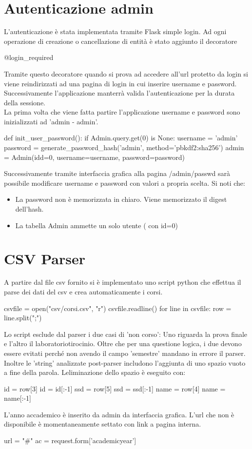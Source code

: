 \documentclass{article}
\begin{document}
\newpage

\section{Autenticazione admin}
L'autenticazione è stata implementata tramite Flask simple login\cite{rif5}.
Ad ogni operazione di creazione o cancellazione di entità è stato aggiunto il decoratore
\begin{python}
@login_required
\end{python}
Tramite questo decoratore quando si prova ad accedere all'url protetto da login si viene reindirizzati ad una pagina di login in cui inserire username e password. Successivamente l'applicazione manterrà valida l'autenticazione per la durata della sessione.\\
La prima volta che viene fatta partire l'applicazione username e password sono inizializzati ad 'admin - admin'.
\begin{python}
def init_user_password():
    if  Admin.query.get(0) is None:
        username = 'admin'
        password = generate_password_hash('admin', method='pbkdf2:sha256')
        admin = Admin(idd=0, username=username, password=password) 
\end{python}
Successivamente tramite interfaccia grafica alla pagina /admin/passwd sarà possibile modificare username e password con valori a propria scelta.
Si noti che:
\begin{itemize}
\item La password non è memorizzata in chiaro. Viene memorizzato il digest dell'hash.
\item La tabella Admin ammette un solo utente ( con id=0)
\end{itemize}

\newpage
\section{CSV Parser}
A partire dal file csv fornito si è implementato uno script python che effettua il parse dei dati del csv e crea automaticamente i corsi.

\begin{python}[caption=Data parser]
csvfile = open("csv/corsi.csv", "r") 
csvfile.readline() 
for line in csvfile:
	row = line.split(";")
\end{python}
Lo script esclude dal parser i due casi di 'non corso': Uno riguarda la prova finale e l'altro il laboratorio\/tirocinio.
Oltre che per una questione logica, i due devono essere evitati perché non avendo il campo 'semestre' mandano in errore il parser.
Inoltre le 'string' analizzate post-parser includono l'aggiunta di uno spazio vuoto a fine della parola. Leliminazione dello spazio è eseguito con:
\begin{python}[caption=String manupulation]
		id = row[3]
		id = id[:-1]
		ssd = row[5]
		ssd = ssd[:-1]
		name = row[4]
		name = name[:-1]
\end{python}
L'anno accademico è inserito da admin da interfaccia grafica. L'url che non è disponibile è momentaneamente settato con link a pagina interna.
\begin{python}
                url = "#"
                ac = request.form['academicyear']
\end{python}
\end{document}
